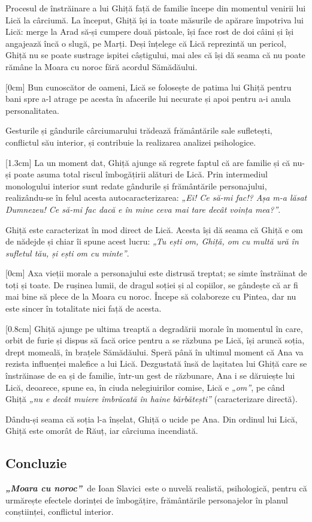 \documentclass[
12pt,
a4paper
]{article}
\newcommand{\operatitle}{\textbf{\textit{„Moara cu noroc”\ }}} %
\newcommand{\operaauthor}{Ioan Slavici\ }                               %
\begin{document}
Procesul de înstrăinare a lui Ghiță față de familie începe din momentul venirii lui Lică la cârciumă. La început, Ghiță își ia toate măsurile de apărare împotriva lui Lică: merge la Arad să-și cumpere două pistoale, își face rost de doi câini și își angajează încă o slugă, pe Marți. Deși înțelege că Lică reprezintă un pericol, Ghiță nu se poate sustrage ispitei câștigului, mai ales că își dă seama că nu poate rămâne la Moara cu noroc fără acordul Sămădăului.

[0cm]
Bun cunoscător de oameni, Lică se folosește de patima lui Ghiță pentru bani spre a-l atrage pe acesta în afacerile lui necurate și apoi pentru a-i anula personalitatea.

Gesturile și gândurile cârciumarului trădează frământările sale sufletești, conflictul său interior, și contribuie la realizarea analizei psihologice.

[1.3cm]
La un moment dat, Ghiță ajunge să regrete faptul că are familie și că nu-și poate asuma total riscul îmbogățirii alături de Lică. Prin intermediul monologului interior sunt redate gândurile și frământările personajului, realizându-se în felul acesta autocaracterizarea: \textit{„Ei! Ce să-mi fac!? Așa m-a lăsat Dumnezeu! Ce să-mi fac dacă e în mine ceva mai tare decât voința mea?”}.

Ghiță este caracterizat în mod direct de Lică. Acesta își dă seama că Ghiță e om de nădejde și chiar îi spune acest lucru: \textit{„Tu ești om, Ghiță, om cu multă ură în sufletul tău, și ești om cu minte”}.

[0cm]
Axa vieții morale a personajului este distrusă treptat; se simte înstrăinat de toți și toate. De rușinea lumii, de dragul soției și al copiilor, se gândește că ar fi mai bine să plece de la Moara cu noroc. Începe să colaboreze cu Pintea, dar nu este sincer în totalitate nici față de acesta.

[0.8cm]
Ghiță ajunge pe ultima treaptă a degradării morale în momentul în care, orbit de furie și dispus să facă orice pentru a se răzbuna pe Lică, își aruncă soția, drept momeală, în brațele Sămădăului. Speră până în ultimul moment că Ana va rezista influenței malefice a lui Lică. Dezgustată însă de lașitatea lui Ghiță care se înstrăinase de ea și de familie, într-un gest de răzbunare, Ana i se dăruiește lui Lică, deoarece, spune ea, în ciuda nelegiuirilor comise, Lică e \textit{„om”}, pe când Ghiță \textit{„nu e decât muiere îmbrăcată în haine bărbătești”} (caracterizare directă).

Dându-și seama că soția l-a înșelat, Ghiță o ucide pe Ana. Din ordinul lui Lică, Ghiță este omorât de Răuț, iar cârciuma incendiată.

\subsection{Concluzie}

\operatitle de \operaauthor este o nuvelă realistă, psihologică, pentru că urmărește efectele dorinței de îmbogățire, frământările personajelor în planul con\-ști\-in\-ței, conflictul interior.
\end{document}
